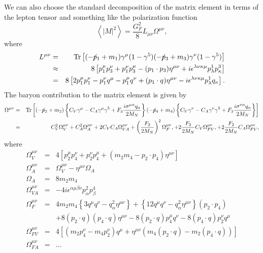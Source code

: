 \documentclass[12pt,letter]{article}
\newcommand{\fsl}[1]{\ensuremath{\mathrlap{\!\not{\phantom{#1}}}#1}}
\begin{document}
We can also choose the standard decomposition of the matrix element in terms of the lepton tensor and something like the polarization function 
\begin{equation*}
\left\langle \left| M \right|^2 \right \rangle = \frac{G_F^2}{8}
L_{\mu \nu} \Omega^{\mu \nu},
\end{equation*}
where 
\begin{eqnarray*}
L^{\mu \nu} &=& \textrm{Tr}\left[
(-\fsl{p}_1 + m_1) \gamma^\mu(1-\gamma^5) 
(-\fsl{p}_3 + m_3) \gamma^\nu(1-\gamma^5)  
\right] \\
&\approx& 8 \left[p_1^\mu p_3^\nu + p_1^\nu p_3^\mu 
- (p_1 \cdot p_3) \eta^{\mu \nu}   
+ i \epsilon^{\lambda \nu \kappa \mu} p_\lambda^1 p_\kappa^3
\right] \\
&=& 8 \left[2p_1^\mu p_1^\nu - p_1^\nu q^\mu - p_1^\mu q^\nu 
+ (p_1 \cdot q) \eta^{\mu \nu}   
- i \epsilon^{\lambda \nu \kappa \mu} p_\lambda^1 q_\kappa
\right].
\end{eqnarray*}
The baryon contribution to the matrix 
element is given by 
\begin{eqnarray*}
\Omega^{\mu \nu} &=& \textrm{Tr}\left[
(-\fsl{p}_2 + m_2) 
\left\{ C_V\gamma^\mu -C_A\gamma^\mu \gamma^5 
+ F_3\frac{i \sigma^{\mu \alpha}q_\alpha}{2 M_N} \right\}
(-\fsl{p}_4 + m_4)
\left \{ C_V\gamma^\nu -C_A\gamma^\nu \gamma^5 
+ F_3\frac{i \sigma^{\nu \alpha}q_\alpha}{2 M_N} \right\}
\right] \\
&=& C_V^2 \Omega^{\mu \nu}_V 
+ C_A^2 \Omega^{\mu \nu}_A 
+ 2 C_V C_A \Omega^{\mu \nu}_{VA} 
+ \left( \frac{F_2}{2 M_N}\right)^2 \Omega^{\mu \nu}_F,
+ 2\frac{F_2}{2 M_N}C_V \Omega^{\mu \nu}_{FV}, 
+ 2\frac{F_2}{2 M_N}C_A \Omega^{\mu \nu}_{FV}, 
\end{eqnarray*}
where 
\begin{eqnarray*}
\Omega_V^{\mu \nu} &=& 4 \left[
p_2^\mu p_4^\nu + p_2^\nu p_4^\mu + (m_2 m_4 - p_2 \cdot p_4) \eta^{\mu \nu}
\right] \\
\Omega_A^{\mu \nu} &=& \Omega_V^{\mu \nu} - \eta^{\mu \nu} \Omega_A \\
\Omega_A &=& 8 m_2 m_4 \\
\Omega_{VA}^{\mu \nu} &=& - 4i \epsilon^{\alpha \mu \beta \nu} 
p^2_\alpha p^4_\beta \\
\Omega_F^{\mu \nu} &=& 4 m_2 m_4 \left\{3 q^\mu q^\nu - q_\alpha^2 \eta^{\mu \nu} \right\}
+ \left \{ 12 q^\mu q^\nu - q_\alpha^2 \eta^{\mu \nu} \right \} (p_2 \cdot p_4) \\
&&+ 8 (p_2 \cdot q)(p_4 \cdot q) \eta^{\mu \nu} 
- 8 (p_2 \cdot q) p_4^\mu q^\nu
- 8 (p_4 \cdot q) p_2^\nu q^\mu \\
\Omega_{FV}^{\mu \nu} &=& 4 \left[(m_2 p_4^\nu - m_4 p_2^\nu)q^\mu 
+ \eta^{\mu \nu}\left(m_4 (p_2 \cdot q) - m_2(p_4\cdot q) \right)  \right] \\
\Omega_{FA}^{\mu \nu} &=&...
\end{eqnarray*}
\end{document}
